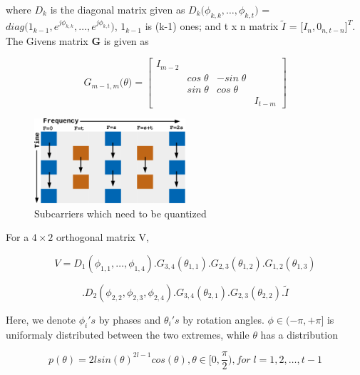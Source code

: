 \documentclass[conference]{IEEEtran}
\begin{document}
where $D_{k}$ is the diagonal matrix given as $D_{k}\big(\phi_{k,k}, \ldots, \phi_{k,t} \big)$ =  $diag\big( 1_{k-1}, e^{j\phi_{k,k}},\ldots, e^{j\phi_{k,t}}  \big)$, $1_{k-1}$ is (k-1) ones; and t x n matrix $\tilde{I}$ = $\big[I_{n}, 0_{n,t-n}\big]^{T}$. The Givens matrix \textbf{G} is given as 

\begin{equation} 
G_{m-1,m}\big(\theta\big)  = 
\begin{bmatrix}

I_{m-2} & & & \\ 
& cos\;\theta & - sin\;\theta & \\ 
& sin\;\theta & cos\;\theta & \\ 
& & & I_{t-m}

\end{bmatrix} 
\end{equation} 
  

\begin{figure} 
\includegraphics[width=0.5\textwidth]{images/adpm.pdf} 
\caption{Subcarriers which need to be quantized} 
\label{ber_overvie}
\vspace{-5pt} 
\end{figure} 


For a $4 \times 2$ orthogonal matrix V, 

$$V = D_{1}(\phi_{1,1},\ldots,\phi_{1,4}).G_{3,4}(\theta_{1,1}) .G_{2,3}(\theta_{1,2}) .G_{1,2}(\theta_{1,3})$$ 

\vspace{-1.4em} 

\hspace{1pt}$$.D_{2}(\phi_{2,2},\phi_{2,3},\phi_{2,4}) .G_{3,4}(\theta_{2,1}) .G_{2,3}(\theta_{2,2}).\tilde{I}$$ 

  

Here, we denote $\phi_{i}'s$ by phases and $\theta_{i}'s$ by rotation angles. $\phi \in (-\pi, + \pi]$ is uniformaly distributed between the two extremes\cite{4114278}, while $\theta$ has a distribution 

\begin{equation} 
p(\theta) = 2lsin(\theta)^{2l-1}cos(\theta), \theta \in [0, \frac{\pi}{2}), for \; l = 1,2,\ldots,t-1
\end{equation}
\end{document}
